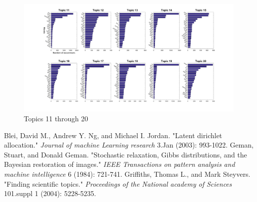 \documentclass{article}
\begin{document}
    \begin{landscape}
      \begin{figure}
        \includegraphics[width=\linewidth]{AllTopics_2.png}
        \caption{Topics 11 through 20}
        \label{fig:t2Fig}
      \end{figure}
    \end{landscape}

  \begin{thebibliography}{9}
    Blei, David M., Andrew Y. Ng, and Michael I. Jordan. "Latent dirichlet allocation." \emph{Journal of machine Learning research} 3.Jan (2003): 993-1022.
    Geman, Stuart, and Donald Geman. "Stochastic relaxation, Gibbs distributions, and the Bayesian restoration of images." \emph{IEEE Transactions on pattern analysis and machine intelligence} 6 (1984): 721-741.
    Griffiths, Thomas L., and Mark Steyvers. "Finding scientific topics." \emph{Proceedings of the National academy of Sciences} 101.suppl 1 (2004): 5228-5235.
  \end{thebibliography}
\end{document}
